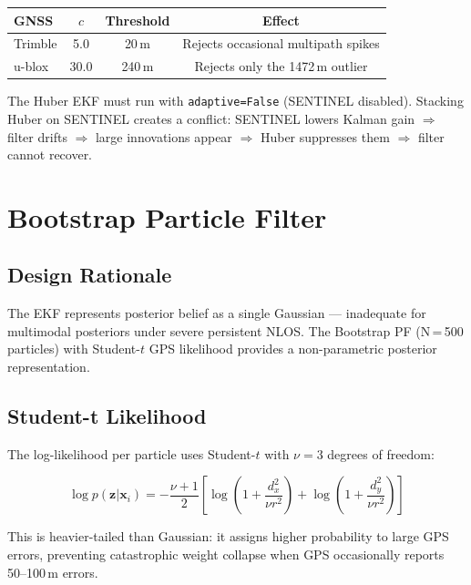 \documentclass[12pt,a4paper]{article}
\begin{document}
\begin{center}
  \begin{tabular}{lccc}
    \toprule
    GNSS & $c$ & Threshold & Effect \\
    \midrule
    Trimble & 5.0 & 20\,m & Rejects occasional multipath spikes \\
    u-blox  & 30.0 & 240\,m & Rejects only the 1472\,m outlier \\
    \bottomrule
  \end{tabular}
\end{center}

The Huber EKF must run with \texttt{adaptive=False} (SENTINEL disabled).
Stacking Huber on SENTINEL creates a conflict: SENTINEL lowers Kalman gain
$\Rightarrow$ filter drifts $\Rightarrow$ large innovations appear $\Rightarrow$
Huber suppresses them $\Rightarrow$ filter cannot recover.

\section{Bootstrap Particle Filter}

\subsection{Design Rationale}

The EKF represents posterior belief as a single Gaussian — inadequate for multimodal
posteriors under severe persistent NLOS.
The Bootstrap PF (N\,=\,500 particles) with Student-$t$ GPS likelihood provides a
non-parametric posterior representation.

\subsection{Student-t Likelihood}

The log-likelihood per particle uses Student-$t$ with $\nu = 3$ degrees of freedom:

\begin{equation}
  \log p(\mathbf{z}|\mathbf{x}_i) = -\frac{\nu+1}{2}
  \left[\log\!\left(1 + \frac{d_x^2}{\nu r^2}\right) +
        \log\!\left(1 + \frac{d_y^2}{\nu r^2}\right)\right]
\end{equation}

This is heavier-tailed than Gaussian: it assigns higher probability to large GPS errors,
preventing catastrophic weight collapse when GPS occasionally reports 50--100\,m errors.
\end{document}

